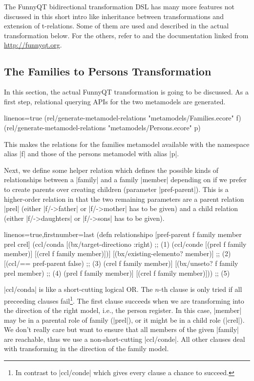 \documentclass[a4paper]{article}
\newcommand{\code}{\clojureinline}
\begin{document}
The FunnyQT bidirectional transformation DSL has many more features not
discussed in this short intro like inheritance between transformations and
extension of t-relations.  Some of them are used and described in the actual
transformation below.  For the others, refer to \cite{diss} and the
documentation linked from \url{http://funnyqt.org}.


\subsection{The Families to Persons Transformation}
\label{sec:f2p-solution}

In this section, the actual FunnyQT transformation is going to be discussed.
As a first step, relational querying APIs for the two metamodels are generated.

\begin{clojurecode*}{linenos=true}
(rel/generate-metamodel-relations "metamodels/Families.ecore" f)
(rel/generate-metamodel-relations "metamodels/Persons.ecore" p)
\end{clojurecode*}

This makes the relations for the families metamodel available with the
namespace alias \code|f| and those of the persons metamodel with alias
\code|p|.

Next, we define some helper relation which defines the possible kinds of
relationships between a \code|family| and a family \code|member| depending on
if we prefer to create parents over creating children (parameter
\code|pref-parent|).  This is a higher-order relation in that the two remaining
parameters are a parent relation \code|prel| (either \code|f/->father| or
\code|f/->mother| has to be given) and a child relation (either
\code|f/->daughters| or \code|f/->sons| has to be given).

\begin{clojurecode*}{linenos=true,firstnumber=last}
(defn relationshipo [pref-parent f family member prel crel]
  (ccl/conda
   [(bx/target-directiono :right)     ;; (1)
    (ccl/conde
     [(prel f family member)]
     [(crel f family member)])]
   [(bx/existing-elemento? member)]   ;; (2)
   [(ccl/== pref-parent false)        ;; (3)
    (crel f family member)]
   [(bx/unseto? f family prel member) ;; (4)
    (prel f family member)]
   [(crel f family member)]))         ;; (5)
\end{clojurecode*}

\code|ccl/conda| is like a short-cutting logical OR.  The \(n\)-th clause is
only tried if all preceeding clauses fail\footnote{In contrast to
  \code|ccl/conde| which gives every clause a chance to succeed.}.  The first
clause succeeds when we are transforming into the direction of the right model,
i.e., the person register.  In this case, \code|member| may be in a parental
role of family (\code|prel|), or it might be in a child role (\code|crel|).  We
don't really care but want to ensure that all members of the given
\code|family| are reachable, thus we use a non-short-cutting \code|ccl/conde|.
All other clauses deal with transforming in the direction of the family model.
\end{document}
